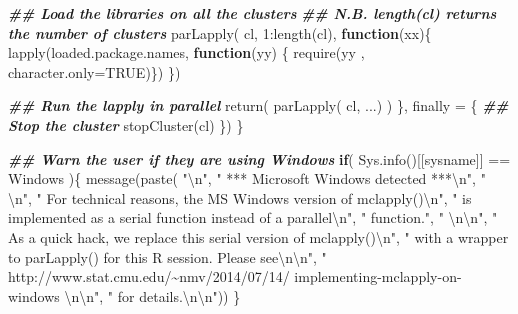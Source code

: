 \documentclass[
  12pt,
  american,
  a4paper,
  extrafontsizes,onecolumn,openright
  ]{memoir}
\newenvironment{Shaded}{\begin{snugshade}}{\end{snugshade}}
\newcommand{\AttributeTok}[1]{\textcolor[rgb]{0.77,0.63,0.00}{#1}}
\newcommand{\ConstantTok}[1]{\textcolor[rgb]{0.00,0.00,0.00}{#1}}
\newcommand{\ControlFlowTok}[1]{\textcolor[rgb]{0.13,0.29,0.53}{\textbf{#1}}}
\newcommand{\DecValTok}[1]{\textcolor[rgb]{0.00,0.00,0.81}{#1}}
\newcommand{\DocumentationTok}[1]{\textcolor[rgb]{0.56,0.35,0.01}{\textbf{\textit{#1}}}}
\newcommand{\FunctionTok}[1]{\textcolor[rgb]{0.00,0.00,0.00}{#1}}
\newcommand{\NormalTok}[1]{#1}
\newcommand{\SpecialCharTok}[1]{\textcolor[rgb]{0.00,0.00,0.00}{#1}}
\newcommand{\StringTok}[1]{\textcolor[rgb]{0.31,0.60,0.02}{#1}}
\begin{document}
\begin{Shaded}
\begin{Highlighting}[]
    \DocumentationTok{\#\# Load the libraries on all the clusters}
    \DocumentationTok{\#\# N.B. length(cl) returns the number of clusters}
    \FunctionTok{parLapply}\NormalTok{( cl, }\DecValTok{1}\SpecialCharTok{:}\FunctionTok{length}\NormalTok{(cl), }\ControlFlowTok{function}\NormalTok{(xx)\{}
      \FunctionTok{lapply}\NormalTok{(loaded.package.names, }\ControlFlowTok{function}\NormalTok{(yy) \{}
        \FunctionTok{require}\NormalTok{(yy , }\AttributeTok{character.only=}\ConstantTok{TRUE}\NormalTok{)\})}
\NormalTok{    \})}
    
    \DocumentationTok{\#\# Run the lapply in parallel }
    \FunctionTok{return}\NormalTok{( }\FunctionTok{parLapply}\NormalTok{( cl, ...) )}
\NormalTok{  \}, }\AttributeTok{finally =}\NormalTok{ \{        }
    \DocumentationTok{\#\# Stop the cluster}
    \FunctionTok{stopCluster}\NormalTok{(cl)}
\NormalTok{  \})}
\NormalTok{\}}

\DocumentationTok{\#\# Warn the user if they are using Windows}
\ControlFlowTok{if}\NormalTok{( }\FunctionTok{Sys.info}\NormalTok{()[[}\StringTok{\textquotesingle{}sysname\textquotesingle{}}\NormalTok{]] }\SpecialCharTok{==} \StringTok{\textquotesingle{}Windows\textquotesingle{}}\NormalTok{ )\{}
  \FunctionTok{message}\NormalTok{(}\FunctionTok{paste}\NormalTok{(}
    \StringTok{"}\SpecialCharTok{\textbackslash{}n}\StringTok{"}\NormalTok{, }
    \StringTok{"   *** Microsoft Windows detected ***}\SpecialCharTok{\textbackslash{}n}\StringTok{"}\NormalTok{,}
    \StringTok{"   }\SpecialCharTok{\textbackslash{}n}\StringTok{"}\NormalTok{,}
    \StringTok{"   For technical reasons, the MS Windows version of mclapply()}\SpecialCharTok{\textbackslash{}n}\StringTok{"}\NormalTok{,}
    \StringTok{"   is implemented as a serial function instead of a parallel}\SpecialCharTok{\textbackslash{}n}\StringTok{"}\NormalTok{,}
    \StringTok{"   function."}\NormalTok{,}
    \StringTok{"   }\SpecialCharTok{\textbackslash{}n\textbackslash{}n}\StringTok{"}\NormalTok{,}
    \StringTok{"   As a quick hack, we replace this serial version of mclapply()}\SpecialCharTok{\textbackslash{}n}\StringTok{"}\NormalTok{,}
    \StringTok{"   with a wrapper to parLapply() for this R session. Please see}\SpecialCharTok{\textbackslash{}n\textbackslash{}n}\StringTok{"}\NormalTok{,}
    \StringTok{"     http://www.stat.cmu.edu/\textasciitilde{}nmv/2014/07/14/}
\StringTok{    implementing{-}mclapply{-}on{-}windows }\SpecialCharTok{\textbackslash{}n\textbackslash{}n}\StringTok{"}\NormalTok{,}
    \StringTok{"   for details.}\SpecialCharTok{\textbackslash{}n\textbackslash{}n}\StringTok{"}\NormalTok{))}
\NormalTok{\}}


\end{Highlighting}
\end{Shaded}
\end{document}

